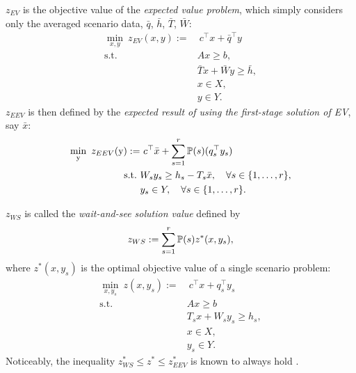 $z_{EV}$ is the objective value of the \textit{expected value problem}, which simply considers only the averaged scenario data, $\bar{q}$, $\bar{h}$, $\bar{T}$, $\bar{W}$:
\begin{subequations}\label{ev}
	\begin{align}
	\min_{x,y}\ z_{EV}(x,y):=&\ c^{\top}x + \bar{q}^{\top}y \label{ev:obj}\\ 
	\mathrm{s.t.}\ &Ax\ge b,  \label{ev:b}\\
	&\bar{T} x+\bar{W} y\ge \bar{h},  \label{ev:c}\\
	&x\in X,  \label{ev:d}\\
	&y \in Y. \label{ev:e}
	\end{align}
\end{subequations}
$z_{EEV}$ is then defined by the \textit{expected result of using the first-stage solution of EV}, say $\bar{x}$: 
\begin{subequations}\label{eev}
	\begin{align}
	\min_{\mathrm{y}}\ z_{EEV}(\mathrm{y}):=&\ c^{\top}\bar{x} + \sum_{s=1}^{r}\operatorname*{\mathbb{P}}(s) (q_s^{\top}y_s) \label{eev:obj}\\ 
	\mathrm{s.t.}\ &W_s y_s\ge h_s-T_s \bar{x},\quad\forall s\in\{1,\ldots,r\}, \label{eev:b}\\
	&y_s \in Y,\quad\forall s\in\{1,\ldots,r\}. \label{eev:c}
	\end{align}
\end{subequations}

$z_{WS}$ is called the \textit{wait-and-see solution value} defined by
\begin{align} \label{ws}
	z_{WS}:=\sum_{s=1}^r \operatorname*{\mathbb{P}}(s)z^*(x,y_s),
\end{align}
where $z^*(x,y_s)$ is the optimal objective value of a single scenario problem: 
\begin{subequations}
	\begin{align}
	\min_{x,y_s}\ z(x,y_s):=&\ c^\top x+q_s^\top y_s \label{ssp:obj}\\
	\mathrm{s.t.}\ &Ax \ge b \label{ssp:b}\\
	&T_s x + W_s y_s\ge h_s,  \label{ssp:c}\\
	&x\in X,  \label{ssp:d}\\
	&y_s \in Y. \label{ssp:e}
	\end{align}
\end{subequations}
Noticeably, the inequality $z^*_{WS}\le z^*\le z^*_{EEV}$ is known to always hold \cite{journal:SKS2013}.

